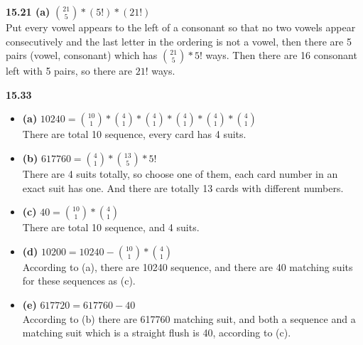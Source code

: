 \documentclass{report}
\begin{document}
\textbf{15.21 (a)} ${21 \choose 5}*(5!)*(21!)$  \\
Put every vowel appears to the left of a consonant so that no two vowels appear consecutively and the last letter in the ordering is not a vowel, then there are 5 pairs (vowel, consonant) which has ${21 \choose 5}*5!$ ways. Then there are 16 consonant left with 5 pairs, so there are $21!$ ways.

\textbf{15.33}
\begin{itemize}
	\item \textbf{(a)} $10240 = {10 \choose 1}*{4 \choose 1}*{4 \choose 1}*{4 \choose 1}*{4 \choose 1}*{4 \choose 1}$ \\
	There are total 10 sequence, every card has 4 suits.
	\item \textbf{(b)} $617760 = {4 \choose 1}*{13 \choose 5}*5!$  \\
	There are 4 suits totally, so choose one of them, each card number in an exact suit has one. And there are totally 13 cards with different numbers.
	\item \textbf{(c)} $40={10 \choose 1}*{4 \choose 1}$  \\
	There are total 10 sequence, and 4 suits.
	\item \textbf{(d)} $10200 = 10240-{10 \choose 1}*{4 \choose 1}$  \\
	According to (a), there are 10240 sequence, and there are 40 matching suits for these sequences as (c).
	\item \textbf{(e)} $617720 = 617760-40$  \\
	According to (b) there are 617760 matching suit, and both a sequence and a matching suit which is a straight flush is 40, according to (c).
\end{itemize}
\end{document}
